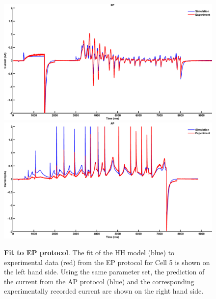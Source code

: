 \documentclass[11pt,a4paper,oneside]{article}
\begin{document}
\begin{figure}[hb]
\begin{center}
\includegraphics[scale=0.42]{Figures/Fig_hh_16713110_FP_equal_proportions_CP_equal_proportions.png}
\includegraphics[scale=0.42]{Figures/Fig_hh_16713110_FP_equal_proportions_CP_ap.png}
\caption{\textbf{Fit to EP protocol}. The fit of the HH model (blue) to experimental data (red) from the EP protocol  for Cell 5 is shown on the left hand side. Using the same parameter set, the prediction of the current from the AP protocol (blue) and the corresponding experimentally recorded current are shown on the right hand side.} 
\label{Fig_EPfit}
\end{center}
\end{figure}
\end{document}
